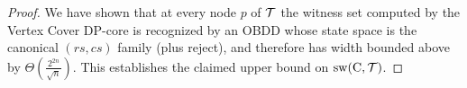 \begin{proof}
\smallskip
We have shown that at every node $p$ of $\mathcal{T}$ the witness set computed by
the {\sc Vertex Cover} DP-core is recognized by an OBDD whose state space is the
canonical $(rs,cs)$ family (plus reject), and therefore has width bounded above
by $\Theta\!\left(\frac{2^{2n}}{\sqrt{n}}\right)$. This establishes the claimed
upper bound on $\mathrm{sw}(\mathrm{C},\mathcal{T})$.
\end{proof}
